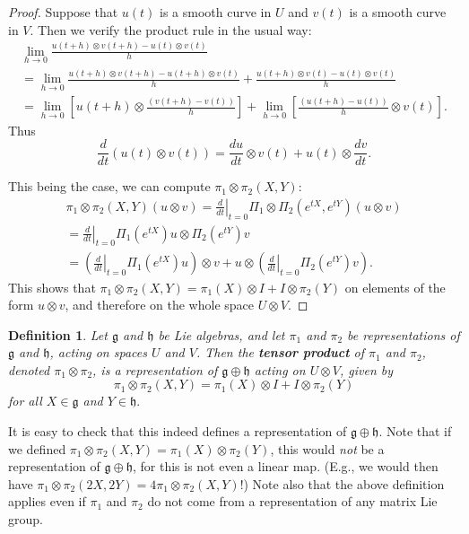 \documentclass{amsbook}
\let \frak = \mathfrak
\theoremstyle{plain}
\newtheorem{definition}[theorem]{Definition}
\numberwithin{equation}{chapter}
\numberwithin{theorem}{chapter}
\begin{document}
\begin{proof}
Suppose that $u(t)$ is a smooth curve in $U$ and $v(t)$ is a smooth curve in
$V$. Then we verify the product rule in the usual way:
\begin{align*}
\lim_{h\rightarrow0}\frac{u(t+h)\otimes v(t+h)-u(t)\otimes v(t)}{h}\\
=\lim_{h\rightarrow0}\frac{u(t+h)\otimes v(t+h)-u(t+h)\otimes v(t)}{h}%
+\frac{u(t+h)\otimes v(t)-u(t)\otimes v(t)}{h}\\
=\lim_{h\rightarrow0}\left[  u(t+h)\otimes\frac{\left(  v(t+h)-v\left(
t\right)  \right)  }{h}\right]  +\lim_{h\rightarrow0}\left[  \frac{\left(
u(t+h)-u\left(  t\right)  \right)  }{h}\otimes v(t)\right]  \text{.}%
\end{align*}
Thus
\[
\frac{d}{dt}\left(  u(t)\otimes v(t)\right)  =\frac{du}{dt}\otimes
v(t)+u(t)\otimes\frac{dv}{dt}\text{.}%
\]

This being the case, we can compute $\pi_{1}\otimes\pi_{2}(X,Y)$:
\begin{align*}
\pi_{1}\otimes\pi_{2}(X,Y)(u\otimes v)=\left.  \frac{d}{dt}\right|  _{t=0}%
\Pi_{1}\otimes\Pi_{2}(e^{tX},e^{tY})(u\otimes v)\\
=\left.  \frac{d}{dt}\right|  _{t=0}\Pi_{1}(e^{tX})u\otimes\Pi_{2}(e^{tY})v\\
=\left(  \left.  \frac{d}{dt}\right|  _{t=0}\Pi_{1}(e^{tX})u\right)  \otimes
v+u\otimes\left(  \left.  \frac{d}{dt}\right|  _{t=0}\Pi_{2}(e^{tY})v\right)
\text{.}%
\end{align*}
This shows that $\pi_{1}\otimes\pi_{2}(X,Y)=\pi_{1}(X)\otimes I+I\otimes
\pi_{2}(Y)$ on elements of the form $u\otimes v$, and therefore on the whole
space $U\otimes V$.
\end{proof}

\begin{definition}
\label{tensor.algebra.2}Let $\frak{g}$ and $\frak{h}$ be Lie algebras, and let
$\pi_{1}$ and $\pi_{2}$ be representations of $\frak{g}$ and $\frak{h}$,
acting on spaces $U$ and $V$. Then the \textbf{tensor product} of $\pi_{1}$
and $\pi_{2}$, denoted $\pi_{1}\otimes\pi_{2}$, is a representation of
$\frak{g}\oplus\frak{h}$ acting on $U\otimes V$, given by
\[
\pi_{1}\otimes\pi_{2}(X,Y)=\pi_{1}(X)\otimes I+I\otimes\pi_{2}(Y)
\]
for all $X\in\frak{g}$ and $Y\in\frak{h}.$
\end{definition}

It is easy to check that this indeed defines a representation of
$\frak{g}\oplus\frak{h}$. Note that if we defined $\pi_{1}\otimes\pi
_{2}(X,Y)=\pi_{1}(X)\otimes\pi_{2}(Y)$, this would \textit{not} be a
representation of $\frak{g}\oplus\frak{h}$, for this is not even a linear map.
(E.g., we would then have $\pi_{1}\otimes\pi_{2}(2X,2Y)=4\pi_{1}\otimes\pi
_{2}(X,Y)$!) Note also that the above definition applies even if $\pi_{1}$ and
$\pi_{2}$ do not come from a representation of any matrix Lie group.
\end{document}
